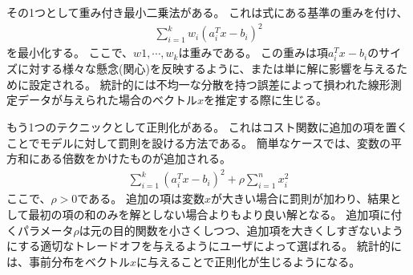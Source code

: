 \documentclass[a4paper, 10pt, uplatex]{jsreport}
\begin{document}
その1つとして重み付き最小二乗法がある。
これは式にある基準の重みを付け、
\begin{align}
    \sum^k_{i=1}w_i(a^T_ix-b_i)^2
\end{align}
を最小化する。
ここで、$w1,\cdots,w_k$は重みである。
この重みは項$a^T_ix-b_i$のサイズに対する様々な懸念(関心)を反映するように、または単に解に影響を与えるために設定される。
統計的には不均一な分散を持つ誤差によって損われた線形測定データが与えられた場合のベクトル$x$を推定する際に生じる。

もう1つのテクニックとして正則化がある。
これはコスト関数に追加の項を置くことでモデルに対して罰則を設ける方法である。
簡単なケースでは、変数の平方和にある倍数をかけたものが追加される。
\begin{align}
    \sum^k_{i=1}(a_i^Tx-b_i)^2+\rho \sum^n_{i=1}x^2_i
\end{align}
ここで、$\rho > 0$である。
追加の項は変数$x$が大きい場合に罰則が加わり、結果として最初の項の和のみを解としない場合よりもより良い解となる。
追加項に付くパラメータ$\rho$は元の目的関数を小さくしつつ、追加項を大きくしすぎないようにする適切なトレードオフを与えるようにユーザによって選ばれる。
統計的には、事前分布をベクトル$x$に与えることで正則化が生じるようになる。
\end{document}
